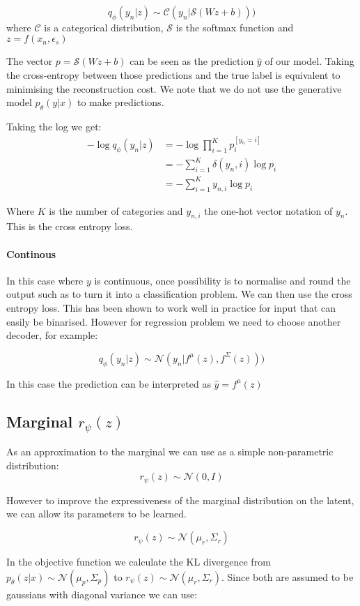 \documentclass[11pt,oneside,openright]{report}
\begin{document}
$$ q_\phi(y_n|z) \sim \mathcal{C}(y_n| \mathcal{S}(Wz + b)))$$ where $\mathcal{C}$ is a categorical distribution, $\mathcal{S}$ is the softmax function and $z = f(x_n, \epsilon_s)$

The vector $ p = \mathcal{S}(Wz + b) $ can be seen as the prediction $\hat{y}$ of our model. Taking the cross-entropy between those predictions and the true label is equivalent to minimising the reconstruction cost. We note that we do not use the generative model $p_\theta(y|x)$ to make predictions.

Taking the log we get:
\begin{align}
- \log q_\phi(y_n|z) &= - \log \prod_{i=1}^{K} p_i^{[y_n=i]}\\
&= - \sum_{i=1}^{K} \delta(y_n, i) \log p_i\\
&= - \sum_{i=1}^{K} y_{n, i} \log p_i
\end{align}

Where $K$ is the number of categories and $y_{n, i}$ the one-hot vector notation of $y_n$. This is the cross entropy loss.

\paragraph{Continous}
In this case where $y$ is continuous, once possibility is to normalise and round the output such as to turn it into a classification problem. We can then use the cross entropy loss. This has been shown to work well in practice \cite{draw} for input that can easily be binarised. However for regression problem we need to choose another decoder, for example:

$$ q_\phi(y_n|z) \sim \mathcal{N}(y_n| f^\mu(z), f^\Sigma(z)))$$ 

In this case the prediction can be interpreted as $\hat{y} = f^\mu(z)$

\subsection{Marginal $r_\psi(z)$}

As an approximation to the marginal we can use as a simple non-parametric distribution:
$$r_\psi(z) \sim \mathcal{N}(0, I)$$

However to improve the expressiveness of the marginal distribution on the latent, we can allow its parameters to be learned. 

$$r_\psi(z) \sim \mathcal{N}(\mu_r, \Sigma_r)$$

In the objective function we calculate the KL divergence from $p_\theta(z|x) \sim \mathcal{N}(\mu_p, \Sigma_p)$ to $r_\psi(z) \sim \mathcal{N}(\mu_r, \Sigma_r)$. Since both are assumed to be gaussians with diagonal variance we can use:
\end{document}
